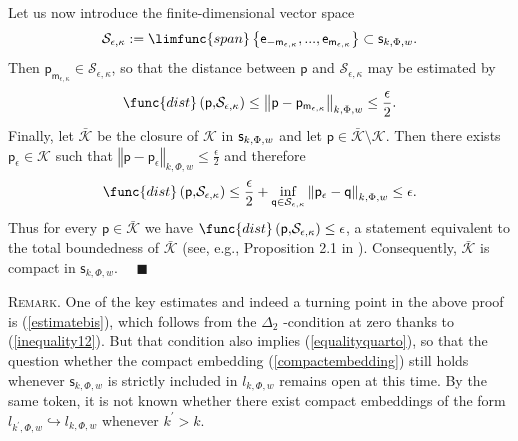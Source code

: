 \documentclass{article}
\begin{document}
Let us now introduce the finite-dimensional vector space%
\begin{equation*}
\mathcal{S}_{\epsilon ,\kappa }:=\limfunc{span}\left\{ \mathsf{e}_{-\mathsf{m%
}_{\epsilon ,\kappa }},...,\mathsf{e}_{\mathsf{m}_{\epsilon ,\kappa
}}\right\} \subset \mathsf{s}_{k,\Phi ,w}.
\end{equation*}%
Then $\mathsf{p}_{\mathsf{m}_{\epsilon ,\kappa }}\in \mathcal{S}_{\epsilon
,\kappa }$, so that the distance between $\mathsf{p}$ and $\mathcal{S}%
_{\epsilon ,\kappa }$ may be estimated by%
\begin{equation*}
\func{dist}\left( \mathsf{p,}\mathcal{S}_{\epsilon ,\kappa }\right) \leq
\left\Vert \mathsf{p}-\mathsf{p}_{\mathsf{m}_{\epsilon ,\kappa }}\right\Vert
_{k,\Phi ,w}\leq \frac{\epsilon }{2}.
\end{equation*}%
Finally, let $\mathcal{\bar{K}}$ be the closure of $\mathcal{K}$ in $\mathsf{%
s}_{k,\Phi ,w}$ and let $\mathsf{p}\in \mathcal{\bar{K}\setminus K}$. Then
there exists $\mathsf{p}_{\epsilon }\in \mathcal{K}$ such that $\left\Vert 
\mathsf{p}-\mathsf{p}_{\epsilon }\right\Vert _{k,\Phi ,w}\leq \frac{\epsilon 
}{2}$ and therefore%
\begin{equation*}
\func{dist}\left( \mathsf{p,}\mathcal{S}_{\epsilon ,\kappa }\right) \leq 
\frac{\epsilon }{2}+\inf_{\mathsf{q\in }\mathcal{S}_{\epsilon ,\kappa
}}\left\Vert \mathsf{p}_{\epsilon }-\mathsf{q}\right\Vert _{k,\Phi ,w}\leq
\epsilon \text{.}
\end{equation*}%
Thus for every $\mathsf{p}\in \mathcal{\bar{K}}$ we have $\func{dist}\left( 
\mathsf{p,}\mathcal{S}_{\epsilon ,\kappa }\right) \leq \epsilon $, a
statement equivalent to the total boundedness of $\mathcal{\bar{K}}$ (see,
e.g., Proposition 2.1 in \cite{bisgard}). Consequently, $\mathcal{\bar{K}}$
is compact in $\mathsf{s}_{k,\Phi ,w}$. \ \ $\blacksquare $

\bigskip

\textsc{Remark.} One of the key estimates and indeed a turning point in the
above proof is (\ref{estimatebis}), which follows from the $\Delta _{2}$%
-condition at zero thanks to (\ref{inequality12}). But that condition also
implies (\ref{equalityquarto}), so that the question whether the compact
embedding (\ref{compactembedding}) still holds whenever $\mathsf{s}_{k,\Phi
,w}$ is strictly included in $l_{k,\Phi ,w}$ remains open at this time. By
the same token, it is not known whether there exist compact embeddings of
the form $l_{k^{\prime },\Phi ,w}\hookrightarrow l_{k,\Phi ,w}$ whenever $%
k^{\prime }>k$.
\end{document}
